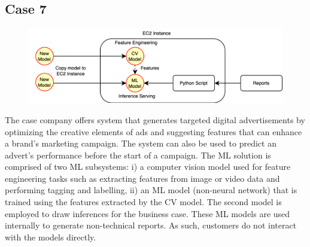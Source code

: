 \subsection*{Case 7} %
\label{case: 7}

\DIFaddbegin \begin{figure}[b]
\centering
\includegraphics[width=\linewidth]{images/case7_deployment_process.png}
\caption{}
\label{fig: case7_deployment_process}
\end{figure}

\DIFaddend %

\DIFdelbegin %
{%
}

\DIFdelend The case company offers \DIFdelbegin {}\DIFdelend \DIFaddbegin {}\DIFaddend system that generates targeted digital advertisements by optimizing the creative elements of ads and suggesting features that can enhance a brand's marketing campaign. The system can also be used to predict an advert's performance before the start of a campaign. The ML solution is comprised of two ML subsystems: i) a computer vision model used for feature engineering tasks such as extracting features from image or video data and performing tagging and labelling, ii) an ML model (non-neural network) that is trained using the features extracted by the CV model. The second model is employed to draw inferences for the business case. These ML models are used internally to generate non-technical reports. As such, customers do not interact with the models directly. %

